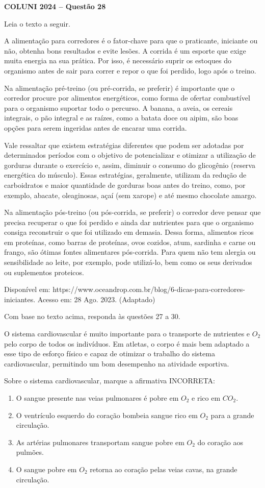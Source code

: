 \textbf{COLUNI 2024 -- Questão 28}\par\medskip Leia o texto a seguir.

A alimentação para corredores é o fator-chave para que o praticante, iniciante ou não, obtenha bons resultados e evite lesões. A corrida é um esporte que exige muita energia na sua prática. Por isso, é necessário suprir os estoques do organismo antes de sair para correr e repor o que foi perdido, logo após o treino.

Na alimentação pré-treino (ou pré-corrida, se preferir) é importante que o corredor procure por alimentos energéticos, como forma de ofertar combustível para o organismo suportar todo o percurso. A banana, a aveia, os cereais integrais, o pão integral e as raízes, como a batata doce ou aipim, são boas opções para serem ingeridas antes de encarar uma corrida.

Vale ressaltar que existem estratégias diferentes que podem ser adotadas por determinados períodos com o objetivo de potencializar e otimizar a utilização de gorduras durante o exercício e, assim, diminuir o consumo do glicogênio (reserva energética do músculo). Essas estratégias, geralmente, utilizam da redução de carboidratos e maior quantidade de gorduras boas antes do treino, como, por exemplo, abacate, oleaginosas, açaí (sem xarope) e até mesmo chocolate amargo.

Na alimentação pós-treino (ou pós-corrida, se preferir) o corredor deve pensar que precisa recuperar o que foi perdido e ainda dar nutrientes para que o organismo consiga reconstruir o que foi utilizado em demasia. Dessa forma, alimentos ricos em proteínas, como barras de proteínas, ovos cozidos, atum, sardinha e carne ou frango, são ótimas fontes alimentares pós-corrida. Para quem não tem alergia ou sensibilidade ao leite, por exemplo, pode utilizá-lo, bem como os seus derivados ou suplementos proteicos.

Disponível em: https://www.oceandrop.com.br/blog/6-dicas-para-corredores-iniciantes. Acesso em: 28 Ago. 2023. (Adaptado)

Com base no texto acima, responda às questões 27 a 30.

O sistema cardiovascular é muito importante para o transporte de nutrientes e $O_2$ pelo corpo de todos os indivíduos. Em atletas, o corpo é mais bem adaptado a esse tipo de esforço físico e capaz de otimizar o trabalho do sistema cardiovascular, permitindo um bom desempenho na atividade esportiva.

\par

Sobre o sistema cardiovascular, marque a afirmativa INCORRETA:\begin{enumerate}
\item O sangue presente nas veias pulmonares é pobre em $O_2$ e rico em $CO_2$.
\item O ventrículo esquerdo do coração bombeia sangue rico em $O_2$ para a grande circulação.
\item As artérias pulmonares transportam sangue pobre em $O_2$ do coração aos pulmões.
\item O sangue pobre em $O_2$ retorna ao coração pelas veias cavas, na grande circulação.\end{enumerate}
